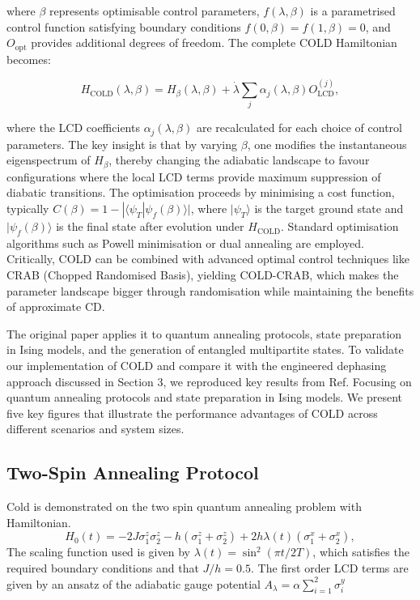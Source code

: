 where $\beta$ represents optimisable control parameters, $f(\lambda, \beta)$ is a parametrised control function satisfying boundary conditions $f(0, \beta) = f(1, \beta) = 0$, and $O_{\text{opt}}$ provides additional degrees of freedom. The complete COLD Hamiltonian becomes:

\begin{equation}
    H_{\text{COLD}}(\lambda, \beta) = H_\beta(\lambda, \beta) + \dot{\lambda}\sum_j \alpha_j(\lambda, \beta) O_{\text{LCD}}^{(j)},
\end{equation}

where the LCD coefficients $\alpha_j(\lambda, \beta)$ are recalculated for each choice of control parameters. The key insight is that by varying $\beta$, one modifies the instantaneous eigenspectrum of $H_\beta$, thereby changing the adiabatic landscape to favour configurations where the local LCD terms provide maximum suppression of diabatic transitions. The optimisation proceeds by minimising a cost function, typically $C(\beta) = 1 - |\langle\psi_T|\psi_f(\beta)\rangle|$, where $|\psi_T\rangle$ is the target ground state and $|\psi_f(\beta)\rangle$ is the final state after evolution under $H_{\text{COLD}}$. Standard optimisation algorithms such as Powell minimisation or dual annealing are employed. Critically, COLD can be combined with advanced optimal control techniques like CRAB (Chopped Randomised Basis), yielding COLD-CRAB, which makes the parameter landscape bigger through randomisation while maintaining the benefits of approximate CD.


\qquad The original paper applies it to quantum annealing protocols, state preparation in Ising models, and the generation of entangled multipartite states. To validate our implementation of COLD and compare it with the engineered dephasing approach discussed in Section 3, we reproduced key results from Ref.\cite{COLD2023} Focusing on quantum annealing protocols and state preparation in Ising models. We present five key figures that illustrate the performance advantages of COLD across different scenarios and system sizes.

\subsection{Two-Spin Annealing Protocol}
\qquad Cold is demonstrated on the two spin quantum annealing problem with Hamiltonian.
\begin{equation}
    H_0(t) = -2J\sigma_1^z\sigma_2^z - h(\sigma_1^z + \sigma_2^z) + 2h\lambda(t)(\sigma_1^x + \sigma_2^x),
\end{equation}
The scaling function used is given by $\lambda(t) = \sin^2(\pi t/2T)$, which satisfies the required boundary conditions and that $J/h=0.5$. The first order LCD terms are given by an ansatz of the adiabatic gauge potential $A_\lambda = \alpha \sum^2_{i=1} \sigma_i^y$


